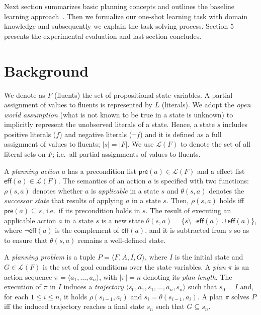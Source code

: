 \documentclass{article}
\newcommand{\tup}[1]{{\langle #1 \rangle}}
\newcommand{\pre}{\mathsf{pre}}     %
\newcommand{\eff}{\mathsf{eff}}     %
\begin{document}
Next section summarizes basic planning concepts and outlines the baseline learning approach~\cite{aineto2018learning}. Then we formalize our one-shot learning task with domain knowledge and subsequently we explain the task-solving process. Section 5 presents the experimental evaluation and last section concludes.



\section{Background}
\label{sec:background}

We denote as $F$ (fluents) the set of  propositional state variables. A partial assignment of values to fluents is represented by $L$ (literals). We adopt the \emph{open world assumption} (what is not known to be true in a state is unknown) to implicitly represent the unobserved literals of a state. Hence, a state $s$ includes positive literals ($f$) and negative literals ($\neg f$) and it is defined as a full assignment of values to fluents; $|s|=|F|$. We use $\mathcal{L}(F)$ to denote the set of all literal sets on $F$; i.e.~all partial assignments of values to fluents.

A {\em planning action} $a$ has a precondition list $\pre(a)\in\mathcal{L}(F)$ and a effect list $\eff(a)\in\mathcal{L}(F)$. The semantics of an action $a$ is specified with two functions: $\rho(s,a)$ denotes whether $a$ is {\em applicable} in a state $s$ and $\theta(s,a)$ denotes the {\em successor state} that results of applying $a$ in a state $s$. Then, $\rho(s,a)$ holds iff $\pre(a)\subseteq s$, i.e.~if its precondition holds in $s$. The result of executing an applicable action $a$ in a state $s$ is a new state $\theta(s,a)=\{s\setminus \neg\eff(a)\cup\eff(a)\}$, where $\neg\eff(a)$ is the complement of $\eff(a)$, and it is subtracted from $s$ so as to ensure that $\theta(s,a)$ remains a well-defined state.


A {\em planning problem} is a tuple $P=\tup{F,A,I,G}$, where $I$ is the initial state and $G\in\mathcal{L}(F)$ is the set of goal conditions over the state variables. A {\em plan} $\pi$ is an action sequence $\pi=\tup{a_1, \ldots, a_n}$, with $|\pi|=n$ denoting its {\em plan length}. The execution of $\pi$ in $I$ induces a {\em trajectory} $\tup{s_0, a_1, s_1, \ldots, a_n, s_n}$ such that $s_0=I$ and, for each {\small $1\leq i\leq n$}, it holds $\rho(s_{i-1},a_i)$ and $s_i=\theta(s_{i-1},a_i)$. A plan $\pi$ solves $P$ iff the induced trajectory reaches a final state $s_n$ such that $G \subseteq s_n$.
\end{document}
